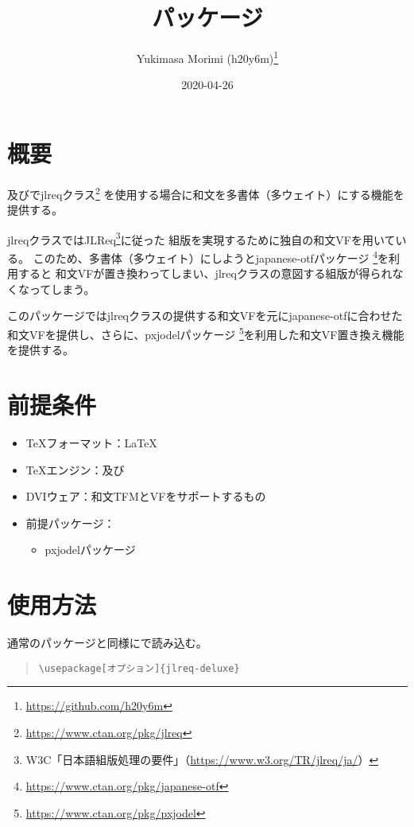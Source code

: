 \documentclass[dvipdfmx,a4paper]{jlreq}
\title{\pkg{jlreq-deluxe}パッケージ}
\author{Yukimasa Morimi (h20y6m)\thanks{\url{https://github.com/h20y6m}}}
\date{2020-04-26}
\newcommand{\pkg}[1]{\textsf{#1}}
\newcommand{\cls}[1]{\textsf{#1}}
\newcommand{\cmd}[1]{\eghostguarded{\texttt{\symbol{92}#1}}}
\begin{document}
\maketitle


\section{概要}

\pLaTeX 及び\upLaTeX で\cls{jlreq}クラス\footnote{\url{https://www.ctan.org/pkg/jlreq}}%
を使用する場合に和文を多書体（多ウェイト）にする機能を提供する。

\cls{jlreq}クラスではJLReq\footnote{W3C「日本語組版処理の要件」（\url{https://www.w3.org/TR/jlreq/ja/}）}に従った
組版を実現するために独自の和文VFを用いている。
このため、多書体（多ウェイト）にしようと\pkg{japanese-otf}パッケージ
\footnote{\url{https://www.ctan.org/pkg/japanese-otf}}を利用すると
和文VFが置き換わってしまい、\pkg{jlreq}クラスの意図する組版が得られなくなってしまう。

このパッケージでは\cls{jlreq}クラスの提供する和文VFを元に\pkg{japanese-otf}に合わせた
和文VFを提供し、さらに、\pkg{pxjodel}パッケージ
\footnote{\url{https://www.ctan.org/pkg/pxjodel}}を利用した和文VF置き換え機能を提供する。


\section{前提条件}

\begin{itemize}
\item \TeX フォーマット：\LaTeX
\item \TeX エンジン：\pTeX 及び\upTeX
\item DVIウェア：和文TFMとVFをサポートするもの
\item 前提パッケージ：
  \begin{itemize}
  \item \pkg{pxjodel}パッケージ
  \end{itemize}
\end{itemize}


\section{使用方法}

通常のパッケージと同様に\cmd{usepackage}で読み込む。

\begin{quote}
\begin{verbatim}
\usepackage[オプション]{jlreq-deluxe}
\end{verbatim}
\end{quote}
\end{document}
